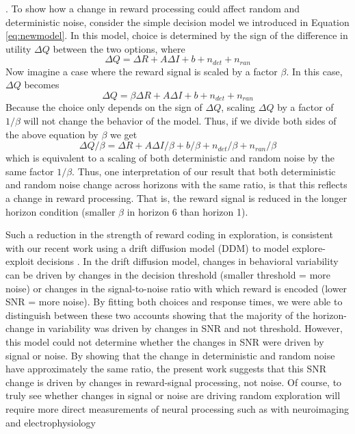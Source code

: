 \documentclass[12pt]{article}
\begin{document}
{. To show how a change in reward processing could affect random and deterministic noise, consider the simple decision model we introduced in Equation \ref{eq:newmodel}. In this model, choice is determined by the sign of the difference in utility $\Delta Q$ between the two options, where
\begin{equation}
	\label{eq:noise1}
	\Delta Q = 
	\Delta R + A \Delta I + b + n_{det} + n_{ran}
\end{equation}
Now imagine a case where the reward signal is scaled by a factor $\beta$.  In this case, $\Delta Q$ becomes
\begin{equation}
	\label{eq:noise2}
	\Delta Q = 
	\beta \Delta R + A \Delta I + b + n_{det} + n_{ran}
\end{equation}
Because the choice only depends on the sign of $\Delta Q$, scaling $\Delta Q$ by a factor of $1/\beta$ will not change the behavior of the model.  Thus, if we divide both sides of the above equation by $\beta$ we get
\begin{equation}
	\label{eq:noise3}
	\Delta Q / \beta = 
	\Delta R + A \Delta I / \beta + b / \beta + n_{det} / \beta + n_{ran} / \beta
\end{equation}
which is equivalent to a scaling of both deterministic and random noise by the same factor $1/\beta$. Thus, one interpretation of our result that both deterministic and random noise change across horizons with the same ratio, is that this reflects a change in reward processing. That is, the reward signal is reduced in the longer horizon condition (smaller $\beta$ in horizon 6 than horizon 1).  %

Such a reduction in the strength of reward coding in exploration, is consistent with our recent work using a drift diffusion model (DDM) to model explore-exploit decisions \citep{Feng21}. In the drift diffusion model, changes in behavioral variability can be driven by changes in the decision threshold (smaller threshold = more noise) or changes in the signal-to-noise ratio with which reward is encoded (lower SNR = more noise). By fitting both choices and response times, we were able to distinguish between these two accounts showing that the majority of the horizon-change in variability was driven by changes in SNR and not threshold. However, this model could not determine whether the changes in SNR were driven by signal or noise. By showing that the change in deterministic and random noise have approximately the same ratio, the present work suggests that this SNR change is driven by changes in reward-signal processing, not noise. Of course, to truly see whether changes in signal or noise are driving random exploration will require more direct measurements of neural processing such as with neuroimaging and electrophysiology \citep{Tomov20, Ebitz18,costa1,costa22}



}
\end{document}
